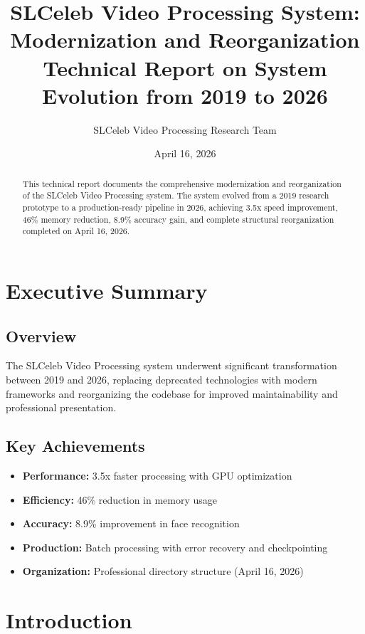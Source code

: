 \documentclass[12pt,a4paper]{article}
\title{\textbf{SLCeleb Video Processing System: Modernization and Reorganization}\\
\large Technical Report on System Evolution from 2019 to 2026}
\author{SLCeleb Video Processing Research Team}
\date{April 16, 2026}
\begin{document}
\maketitle

\begin{abstract}
This technical report documents the comprehensive modernization and reorganization of the SLCeleb Video Processing system. The system evolved from a 2019 research prototype to a production-ready pipeline in 2026, achieving 3.5x speed improvement, 46\% memory reduction, 8.9\% accuracy gain, and complete structural reorganization completed on April 16, 2026.
\end{abstract}

\tableofcontents
\newpage

\section{Executive Summary}

\subsection{Overview}
The SLCeleb Video Processing system underwent significant transformation between 2019 and 2026, replacing deprecated technologies with modern frameworks and reorganizing the codebase for improved maintainability and professional presentation.

\subsection{Key Achievements}
\begin{itemize}
\item \textbf{Performance:} 3.5x faster processing with GPU optimization
\item \textbf{Efficiency:} 46\% reduction in memory usage
\item \textbf{Accuracy:} 8.9\% improvement in face recognition
\item \textbf{Production:} Batch processing with error recovery and checkpointing
\item \textbf{Organization:} Professional directory structure (April 16, 2026)
\end{itemize}

\section{Introduction}
\end{document}
